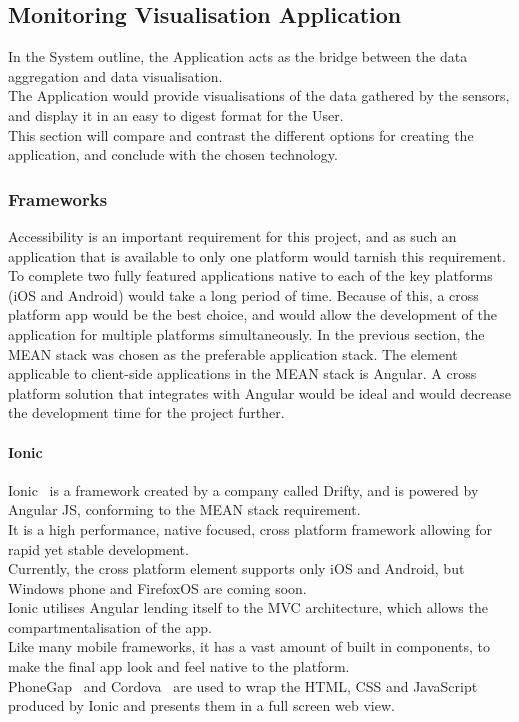 \documentclass[preprint,12pt,3p]{elsarticle}
\begin{document}
\clearpage
\subsection{Monitoring Visualisation Application}
In the System outline, the Application acts as the bridge between the data aggregation and data visualisation.\\
The Application would provide visualisations of the data gathered by the sensors, and display it in an easy to digest format for the User.\\
This section will compare and contrast the different options for creating the application, and conclude with the chosen technology.

\subsubsection{Frameworks}
Accessibility is an important requirement for this project, and as such an application that is available to only one platform would tarnish this requirement.\\
To complete two fully featured applications native to each of the key platforms (iOS and Android) would take a long period of time. Because of this, a cross platform app would be the best choice, and would allow the development of the application for multiple platforms simultaneously.
In the previous section, the MEAN stack was chosen as the preferable application stack. The element applicable to client-side applications in the MEAN stack is Angular. A cross platform solution that integrates with Angular would be ideal and would decrease the development time for the project further.

\paragraph{Ionic}
Ionic~\cite{ionic} is a framework created by a company called Drifty, and is powered by Angular JS, conforming to the MEAN stack requirement.\\
It is a high performance, native focused, cross platform framework allowing for rapid yet stable development.\\
Currently, the cross platform element supports only iOS and Android, but Windows phone and FirefoxOS are coming soon.\\
Ionic utilises Angular lending itself to the MVC architecture, which allows the compartmentalisation of the app.\\
Like many mobile frameworks, it has a vast amount of built in components, to make the final app look and feel native to the platform.\\ PhoneGap~\cite{phonegap} and Cordova~\cite{Cordova} are used to wrap the HTML, CSS and JavaScript produced by Ionic and presents them in a full screen web view.
\end{document}
